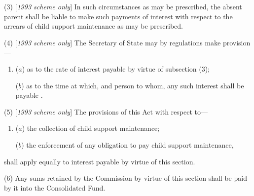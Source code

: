 \documentclass[12pt,a4paper]{article}
\begin{document}
(3) [\emph{1993 scheme only}] In such circumstances as may be prescribed, the absent parent shall be liable to make such payments of interest with respect to the arrears of child support maintenance as may be prescribed.

(4) [\emph{1993 scheme only}] The Secretary of State may by regulations make provision—
\begin{enumerate}\item[]
($a$) as to the rate of interest payable by virtue of subsection (3);

($b$) as to the time at which, and person to whom, any such interest shall be payable%
%
%
.
\end{enumerate}

(5) [\emph{1993 scheme only}] The provisions of this Act with respect to—
\begin{enumerate}\item[]
($a$) the collection of child support maintenance;

($b$) the enforcement of any obligation to pay child support maintenance,
\end{enumerate}
shall apply equally to interest payable by virtue of this section.

(6) Any sums retained by the 
Commission  %
by virtue of this section shall be paid by 
it  %
into the Consolidated Fund.

\end{document}

